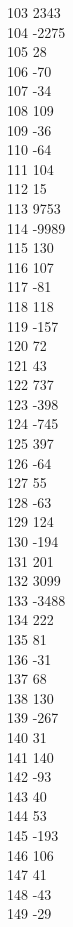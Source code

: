 { 103	2343 \\
 104	-2275 \\
 105	28 \\
 106	-70 \\
 107	-34 \\
 108	109 \\
 109	-36 \\
 110	-64 \\
 111	104 \\
 112	15 \\
 113	9753 \\
 114	-9989 \\
 115	130 \\
 116	107 \\
 117	-81 \\
 118	118 \\
 119	-157 \\
 120	72 \\
 121	43 \\
 122	737 \\
 123	-398 \\
 124	-745 \\
 125	397 \\
 126	-64 \\
 127	55 \\
 128	-63 \\
 129	124 \\
 130	-194 \\
 131	201 \\
 132	3099 \\
 133	-3488 \\
 134	222 \\
 135	81 \\
 136	-31 \\
 137	68 \\
 138	130 \\
 139	-267 \\
 140	31 \\
 141	140 \\
 142	-93 \\
 143	40 \\
 144	53 \\
 145	-193 \\
 146	106 \\
 147	41 \\
 148	-43 \\
 149	-29 \\
}
